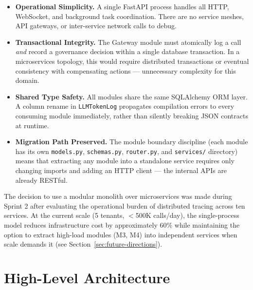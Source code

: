 \documentclass[12pt,a4paper,twoside]{report}
\newcommand{\fastapi}{FastAPI}
\begin{document}
\begin{itemize}
  \item \textbf{Operational Simplicity.} A single \fastapi{} process handles all HTTP, WebSocket, and background task coordination. There are no service meshes, API gateways, or inter-service network calls to debug.

  \item \textbf{Transactional Integrity.} The Gateway module must atomically log a call \textit{and} record a governance decision within a single database transaction. In a microservices topology, this would require distributed transactions or eventual consistency with compensating actions — unnecessary complexity for this domain.

  \item \textbf{Shared Type Safety.} All modules share the same SQLAlchemy ORM layer. A column rename in \texttt{LLMTokenLog} propagates compilation errors to every consuming module immediately, rather than silently breaking JSON contracts at runtime.

  \item \textbf{Migration Path Preserved.} The module boundary discipline (each module has its own \texttt{models.py}, \texttt{schemas.py}, \texttt{router.py}, and \texttt{services/} directory) means that extracting any module into a standalone service requires only changing imports and adding an HTTP client — the internal APIs are already RESTful.
\end{itemize}

\begin{designdecision}
The decision to use a modular monolith over microservices was made during Sprint 2 after evaluating the operational burden of distributed tracing across ten services. At the current scale (5 tenants, $<$500K calls/day), the single-process model reduces infrastructure cost by approximately 60\% while maintaining the option to extract high-load modules (M3, M4) into independent services when scale demands it (see Section~\ref{sec:future-directions}).
\end{designdecision}

\section{High-Level Architecture}
\end{document}
